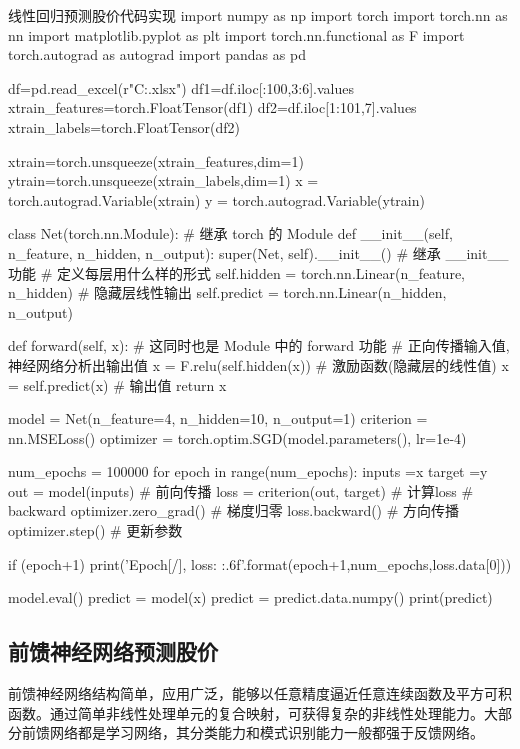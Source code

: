 \documentclass[openbib]{article}
\begin{document}
\begin{Python}{线性回归预测股价代码实现}
import numpy as np
import torch
import torch.nn as nn
import matplotlib.pyplot as plt
import torch.nn.functional as F
import torch.autograd as autograd
import pandas as pd

df=pd.read_excel(r"C:\Users\yjb\Desktop\stock.xlsx")
df1=df.iloc[:100,3:6].values
xtrain_features=torch.FloatTensor(df1)
df2=df.iloc[1:101,7].values
xtrain_labels=torch.FloatTensor(df2)


xtrain=torch.unsqueeze(xtrain_features,dim=1)
ytrain=torch.unsqueeze(xtrain_labels,dim=1)
x = torch.autograd.Variable(xtrain)
y = torch.autograd.Variable(ytrain)

class Net(torch.nn.Module):  # 继承 torch 的 Module
	def __init__(self, n_feature, n_hidden, n_output):
		super(Net, self).__init__()     # 继承 __init__ 功能
# 定义每层用什么样的形式
		self.hidden = torch.nn.Linear(n_feature, n_hidden)   # 隐藏层线性输出
		self.predict = torch.nn.Linear(n_hidden, n_output)

	def forward(self, x):   # 这同时也是 Module 中的 forward 功能
# 正向传播输入值, 神经网络分析出输出值
		x = F.relu(self.hidden(x))      # 激励函数(隐藏层的线性值)
		x = self.predict(x)             # 输出值
		return x
		
model = Net(n_feature=4, n_hidden=10, n_output=1)
criterion = nn.MSELoss()
optimizer = torch.optim.SGD(model.parameters(), lr=1e-4)

num_epochs = 100000
for epoch in range(num_epochs):
	inputs =x
	target =y
	out = model(inputs) # 前向传播
	loss = criterion(out, target) # 计算loss
	# backward
	optimizer.zero_grad() # 梯度归零
	loss.backward() # 方向传播
	optimizer.step() # 更新参数
	
	if (epoch+1) %
		print('Epoch[{}/{}], loss: {:.6f}'.format(epoch+1,num_epochs,loss.data[0]))

model.eval()
predict = model(x)
predict = predict.data.numpy()
print(predict)
\end{Python}
\subsection{前馈神经网络预测股价}

前馈神经网络结构简单，应用广泛，能够以任意精度逼近任意连续函数及平方可积函数。通过简单非线性处理单元的复合映射，可获得复杂的非线性处理能力。大部分前馈网络都是学习网络，其分类能力和模式识别能力一般都强于反馈网络。
\end{document}
